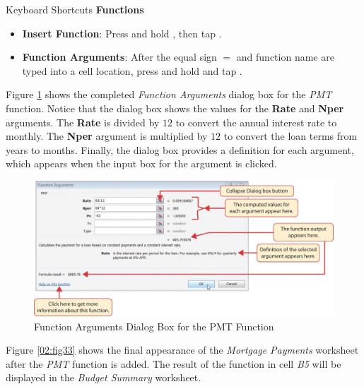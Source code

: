 \begin{center}
	\begin{shtcutbox}{Keyboard Shortcuts}
		\textbf{Functions}
		\\
		\begin{itemize}
			\setlength{\itemsep}{0pt}
			\setlength{\parskip}{0pt}
			\setlength{\parsep}{0pt}
			
			\item \textbf{Insert Function}: Press and hold , then tap .
			\item \textbf{Function Arguments}: After the equal sign $ = $ and function name are typed into a cell location, press and hold  and tap .		
		\end{itemize}
	
	\end{shtcutbox}
\end{center}

Figure \ref{02:fig32} shows the completed \textit{Function Arguments} dialog box for the \textit{PMT} function. Notice that the dialog box shows the values for the \textbf{Rate} and \textbf{Nper} arguments. The \textbf{Rate} is divided by $ 12 $ to convert the annual interest rate to monthly. The \textbf{Nper} argument is multiplied by $ 12 $ to convert the loan terms from years to months. Finally, the dialog box provides a definition for each argument, which appears when the input box for the argument is clicked.

\begin{figure}[H]
	\centering
	\includegraphics[width=\maxwidth{.95\linewidth}]{gfx/ch02_fig32}
	\caption{Function Arguments Dialog Box for the PMT Function}
	\label{02:fig32}
\end{figure}

Figure \ref{02:fig33} shows the final appearance of the \textit{Mortgage Payments} worksheet after the \textit{PMT} function is added. The result of the function in cell \textit{B5} will be displayed in the \textit{Budget Summary} worksheet.

